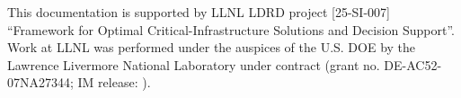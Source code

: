 \documentclass[journal abbreviation, manuscript]{copernicus}
\begin{document}











\newpage

\begin{acknowledgements}
This documentation is supported by LLNL LDRD project [25-SI-007] ``Framework for Optimal Critical-Infrastructure Solutions and Decision Support''. Work at LLNL was performed under the auspices of the U.S. DOE by the Lawrence Livermore National Laboratory under contract (grant no. DE-AC52-07NA27344; IM release: ).
\end{acknowledgements}





\end{document}
